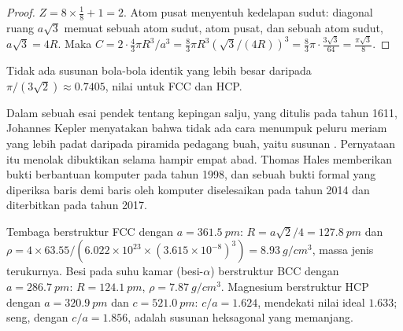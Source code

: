 \begin{proof}
$Z = 8 \times \frac18 + 1 = 2$. Atom pusat menyentuh kedelapan sudut:
diagonal ruang $a\sqrt3$ memuat sebuah atom sudut, atom pusat, dan
sebuah atom sudut, $a\sqrt3 = 4R$. Maka $C = 2 \cdot \frac43\pi R^3/a^3 =
\frac83\pi R^3 (\sqrt3/(4R))^3 = \frac83\pi \cdot \frac{3\sqrt3}{64} =
\frac{\pi\sqrt3}{8}$.
\end{proof}

\begin{proposition}\label{prop:b1:crystals-metals:kepler}
Tidak ada susunan bola-bola identik yang  lebih besar
daripada $\pi/(3\sqrt2) \approx 0.7405$, nilai untuk FCC dan HCP.
\end{proposition}
\admitted

\begin{history}
Dalam sebuah esai pendek tentang kepingan salju, yang ditulis pada tahun
1611, Johannes Kepler menyatakan bahwa tidak ada cara menumpuk peluru
meriam yang lebih padat daripada piramida pedagang buah, yaitu susunan
. Pernyataan itu menolak dibuktikan selama hampir
empat abad. Thomas Hales memberikan bukti berbantuan komputer pada tahun
1998, dan sebuah bukti formal yang diperiksa baris demi baris oleh
komputer diselesaikan pada tahun 2014 dan diterbitkan pada tahun 2017.
\end{history}

\begin{example}\label{ex:b1:crystals-metals:metals}
Tembaga berstruktur FCC dengan $a = \qty{361.5}{pm}$: $R = a\sqrt2/4 =
\qty{127.8}{pm}$ dan $\rho = 4 \times 63.55/(6.022 \times 10^{23} \times
(3.615 \times 10^{-8})^3) = \qty{8.93}{g/cm^3}$, massa jenis terukurnya.
Besi pada suhu kamar (besi-$\alpha$) berstruktur BCC dengan
$a = \qty{286.7}{pm}$: $R = \qty{124.1}{pm}$, $\rho = \qty{7.87}{g/cm^3}$.
Magnesium berstruktur HCP dengan $a = \qty{320.9}{pm}$ dan
$c = \qty{521.0}{pm}$: $c/a = 1.624$, mendekati nilai ideal $1.633$;
seng, dengan $c/a = 1.856$, adalah susunan heksagonal yang memanjang.
\end{example}

